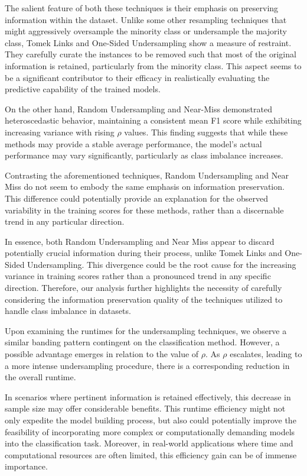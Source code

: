 \documentclass[journal]{IEEEtran}
\begin{document}
	The salient feature of both these techniques is their emphasis on preserving information within the dataset. Unlike some other resampling techniques that might aggressively oversample the minority class or undersample the majority class, Tomek Links and One-Sided Undersampling show a measure of restraint. They carefully curate the instances to be removed such that most of the original information is retained, particularly from the minority class. This aspect seems to be a significant contributor to their efficacy in realistically evaluating the predictive capability of the trained models.
	
	On the other hand, Random Undersampling and Near-Miss demonstrated heteroscedastic behavior, maintaining a consistent mean F1 score while exhibiting increasing variance with rising $\rho$ values. This finding suggests that while these methods may provide a stable average performance, the model's actual performance may vary significantly, particularly as class imbalance increases.

	Contrasting the aforementioned techniques, Random Undersampling and Near Miss do not seem to embody the same emphasis on information preservation. This difference could potentially provide an explanation for the observed variability in the training scores for these methods, rather than a discernable trend in any particular direction.
	
	In essence, both Random Undersampling and Near Miss appear to discard potentially crucial information during their process, unlike Tomek Links and One-Sided Undersampling. This divergence could be the root cause for the increasing variance in training scores rather than a pronounced trend in any specific direction. Therefore, our analysis further highlights the necessity of carefully considering the information preservation quality of the techniques utilized to handle class imbalance in datasets.
	
	Upon examining the runtimes for the undersampling techniques, we observe a similar banding pattern contingent on the classification method. However, a possible advantage emerges in relation to the value of $\rho$. As $\rho$ escalates, leading to a more intense undersampling procedure, there is a corresponding reduction in the overall runtime.
	
	In scenarios where pertinent information is retained effectively, this decrease in sample size may offer considerable benefits. This runtime efficiency might not only expedite the model building process, but also could potentially improve the feasibility of incorporating more complex or computationally demanding models into the classification task. Moreover, in real-world applications where time and computational resources are often limited, this efficiency gain can be of immense importance.
	
\end{document}

